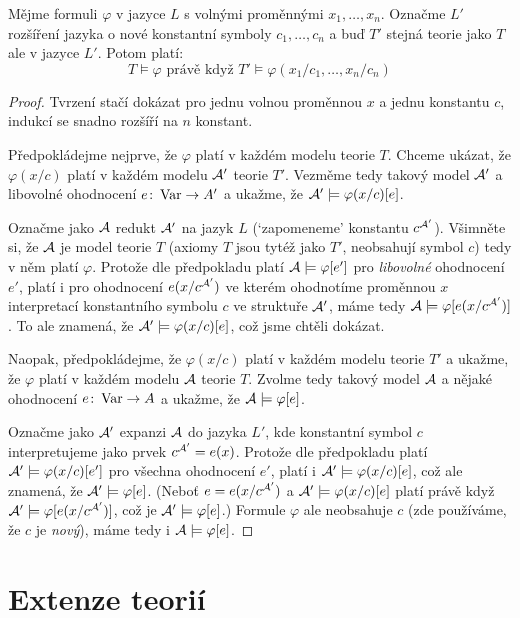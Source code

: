 \begin{theorem}[O konstantách]\label{theorem:on-constants}
    Mějme formuli $\varphi$ v jazyce $L$ s volnými proměnnými $x_1,\dots,x_n$. Označme $L'$ rozšíření jazyka o nové konstantní symboly $c_1,\dots,c_n$ a buď $T'$ stejná teorie jako $T$ ale v jazyce $L'$. Potom platí:
    $$
    T\models\varphi\text{ právě když }T'\models\varphi(x_1/c_1,\dots,x_n/c_n)
    $$
\end{theorem}
\begin{proof}
    Tvrzení stačí dokázat pro jednu volnou proměnnou $x$ a jednu konstantu $c$, indukcí se snadno rozšíří na $n$ konstant.
    
    Předpokládejme nejprve, že $\varphi$ platí v každém modelu teorie $T$. Chceme ukázat, že $\varphi(x/c)$ platí v každém modelu $\mathcal{A}'$ teorie $T'$. Vezměme tedy takový model $\mathcal{A}'$ a libovolné ohodnocení $e\colon\operatorname{Var}\to A'$ a ukažme, že $\mathcal{A}'\models\varphi(x/c)[e]$.

    Označme jako $\mathcal{A}$ redukt $\mathcal{A}'$ na jazyk $L$ (`zapomeneme' konstantu $c^{\mathcal{A}'}$). Všimněte si, že $\mathcal{A}$ je model teorie $T$ (axiomy $T$ jsou tytéž jako $T'$, neobsahují symbol $c$) tedy v něm platí $\varphi$. Protože dle předpokladu platí $\mathcal{A}\models\varphi[e']$ pro \emph{libovolné} ohodnocení $e'$, platí i pro ohodnocení $e(x/c^{\mathcal{A}'})$ ve kterém ohodnotíme proměnnou $x$ interpretací konstantního symbolu $c$ ve struktuře $\mathcal{A}'$, máme tedy $\mathcal{A}\models\varphi[e(x/c^{\mathcal{A}'})]$. To ale znamená, že $\mathcal{A}'\models\varphi(x/c)[e]$, což jsme chtěli dokázat.
    
    Naopak, předpokládejme, že $\varphi(x/c)$ platí v každém modelu teorie $T'$ a ukažme, že $\varphi$ platí v každém modelu $\mathcal{A}$ teorie $T$. Zvolme tedy takový model $\mathcal{A}$ a nějaké ohodnocení $e\colon\operatorname{Var}\to A$ a ukažme, že $\mathcal{A}\models\varphi[e]$.

    Označme jako $\mathcal{A}'$ expanzi $\mathcal{A}$ do jazyka $L'$, kde konstantní symbol $c$ interpretujeme jako prvek $c^{\mathcal{A}'}=e(x)$. Protože dle předpokladu platí $\mathcal{A}'\models\varphi(x/c)[e']$ pro všechna ohodnocení $e'$, platí i $\mathcal{A}'\models\varphi(x/c)[e]$, což ale znamená, že $\mathcal{A}'\models\varphi[e]$. (Neboť $e=e(x/c^{\mathcal{A}'})$ a $\mathcal{A}'\models\varphi(x/c)[e]$ platí právě když $\mathcal{A}'\models\varphi[e(x/c^{\mathcal{A}'})]$, což je $\mathcal{A}'\models\varphi[e]$.) Formule $\varphi$ ale neobsahuje $c$ (zde používáme, že $c$ je \emph{nový}), máme tedy i $\mathcal{A}\models\varphi[e]$.
\end{proof}


\section{Extenze teorií}

